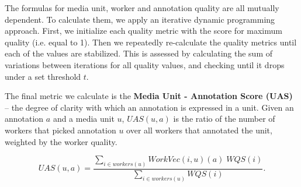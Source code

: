 The formulas for media unit, worker and annotation quality are all mutually dependent. To calculate them, we apply an iterative dynamic programming approach. First, we initialize each quality metric with the score for maximum quality (i.e. equal to 1). Then we repeatedly re-calculate the quality metrics until each of the values are stabilized. This is assessed by calculating the sum of variations between iterations for all quality values, and checking until it drops under a set threshold $t$.

The final metric we calculate is the \textbf{Media Unit - Annotation Score (UAS)} -- the degree of clarity with which an annotation is expressed in a unit. Given an annotation $a$ and a media unit $u$, $UAS(u, a)$ is the ratio of the number of workers that picked annotation $u$ over all workers that annotated the unit, weighted by the worker quality.

$$ UAS(u, a) = \dfrac{ \sum\limits_{i \in workers(u)} WorkVec(i,u)(a) \; WQS(i) }{ \sum\limits_{i \in workers(u)} WQS(i) }. $$


